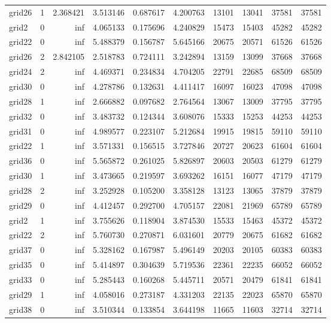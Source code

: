 \begin{longtable}{|l|r|r|r|r|r|r|r|r|r|}
grid26 & 1 & 2.368421 & 3.513146 & 0.687617 & 4.200763 & 13101 & 13041 & 37581 & 37581 \\
grid2 & 0 & inf & 4.065133 & 0.175696 & 4.240829 & 15473 & 15403 & 45282 & 45282 \\
grid22 & 0 & inf & 5.488379 & 0.156787 & 5.645166 & 20675 & 20571 & 61526 & 61526 \\
grid26 & 2 & 2.842105 & 2.518783 & 0.724111 & 3.242894 & 13159 & 13099 & 37668 & 37668 \\
grid24 & 2 & inf & 4.469371 & 0.234834 & 4.704205 & 22791 & 22685 & 68509 & 68509 \\
grid30 & 0 & inf & 4.278786 & 0.132631 & 4.411417 & 16097 & 16023 & 47098 & 47098 \\
grid28 & 1 & inf & 2.666882 & 0.097682 & 2.764564 & 13067 & 13009 & 37795 & 37795 \\
grid32 & 0 & inf & 3.483732 & 0.124344 & 3.608076 & 15333 & 15253 & 44253 & 44253 \\
grid31 & 0 & inf & 4.989577 & 0.223107 & 5.212684 & 19915 & 19815 & 59110 & 59110 \\
grid22 & 1 & inf & 3.571331 & 0.156515 & 3.727846 & 20727 & 20623 & 61604 & 61604 \\
grid36 & 0 & inf & 5.565872 & 0.261025 & 5.826897 & 20603 & 20503 & 61279 & 61279 \\
grid30 & 1 & inf & 3.473665 & 0.219597 & 3.693262 & 16151 & 16077 & 47179 & 47179 \\
grid28 & 2 & inf & 3.252928 & 0.105200 & 3.358128 & 13123 & 13065 & 37879 & 37879 \\
grid29 & 0 & inf & 4.412457 & 0.292700 & 4.705157 & 22081 & 21969 & 65789 & 65789 \\
grid2 & 1 & inf & 3.755626 & 0.118904 & 3.874530 & 15533 & 15463 & 45372 & 45372 \\
grid22 & 2 & inf & 5.760730 & 0.270871 & 6.031601 & 20779 & 20675 & 61682 & 61682 \\
grid37 & 0 & inf & 5.328162 & 0.167987 & 5.496149 & 20203 & 20105 & 60383 & 60383 \\
grid35 & 0 & inf & 5.414897 & 0.304639 & 5.719536 & 22361 & 22235 & 66052 & 66052 \\
grid33 & 0 & inf & 5.285443 & 0.160268 & 5.445711 & 20571 & 20479 & 61841 & 61841 \\
grid29 & 1 & inf & 4.058016 & 0.273187 & 4.331203 & 22135 & 22023 & 65870 & 65870 \\
grid38 & 0 & inf & 3.510344 & 0.133854 & 3.644198 & 11665 & 11603 & 32714 & 32714 \\

\end{longtable}
